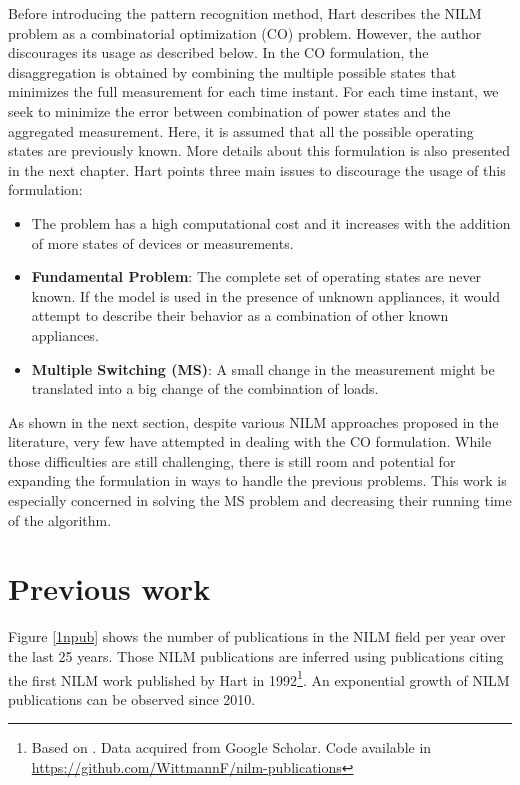 Before introducing the pattern recognition method, Hart describes the NILM problem as a combinatorial optimization (CO) problem. However, the author discourages its usage as described below. In the CO formulation, the disaggregation is obtained by combining the multiple possible states that minimizes the full measurement for each time instant. For each time instant, we seek to minimize the error between combination of power states and the aggregated measurement. Here, it is assumed that all the possible operating states are previously known. More details about this formulation is also presented in the next chapter. Hart points three main issues to discourage the usage of this formulation: 
\begin{itemize}
\item The problem has a high computational cost and it increases with the addition of more states of devices or measurements.
\item \textbf{Fundamental Problem}: The complete set of operating states are never known. If the model is used in the presence of unknown appliances, it would attempt to describe their behavior as a combination of other known appliances. 
\item \textbf{Multiple Switching (MS)}: A small change in the measurement might be translated into a big change of the combination of loads. 
\end{itemize}
As shown in the next section, despite various NILM approaches proposed in the literature, very few have attempted in dealing with the CO formulation. While those difficulties are still challenging, there is still room and potential for expanding the formulation in ways to handle the previous problems. This work is especially concerned in solving the MS problem and decreasing their running time of the algorithm. 


\section{Previous work}

Figure \ref{1npub} shows the number of publications in the NILM field per year over the last 25 years. Those NILM publications are inferred using publications citing the first NILM work published by Hart in 1992\footnote{Based on \cite{1npub}. Data acquired from Google Scholar. Code available in \url{https://github.com/WittmannF/nilm-publications}}. An exponential growth of NILM publications can be observed since 2010.

